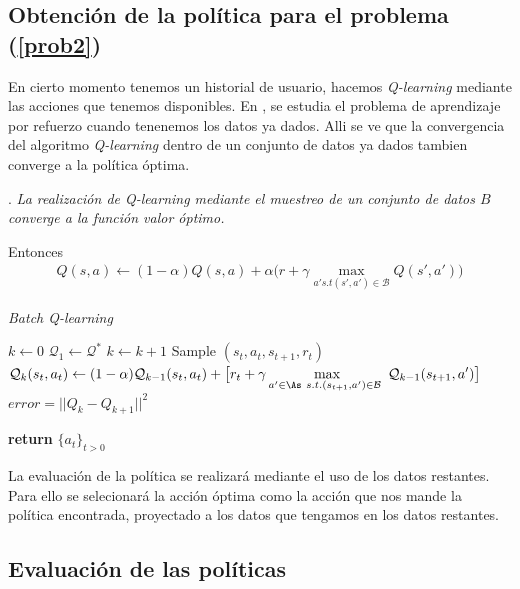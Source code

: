 \subsection{Obtención de la política para el problema (\ref{prob2})}
En cierto momento tenemos un historial de usuario, hacemos \emph{Q-learning} mediante las acciones que tenemos disponibles. En \cite{fujimoto2019off}, se estudia el problema de aprendizaje por refuerzo cuando tenenemos los datos ya dados. Alli se ve que la convergencia del algoritmo \emph{Q-learning} dentro de un conjunto de datos ya dados tambien converge a la política óptima.

\begin{thm}
    \cite{fujimoto2019off}. \textit{La realización de Q-learning mediante el muestreo de un conjunto de datos $B$ converge a la función valor óptimo.}
\end{thm}

Entonces 
\begin{gather}
    Q(s,a) \leftarrow (1-\alpha)Q(s,a) + \alpha \bigg( r +\gamma \max_{a' s.t (s',a') \in \mathcal{B}} Q(s',a') \bigg)
\end{gather}

\begin{algorithm}[!ht]
    \caption{\emph{Batch Q-learning }}\label{Qlearning}
    \begin{algorithmic}[1]
        \State $k \gets 0$
        \State $\mathcal{Q}_1 \gets \mathcal{Q}^{*}$
            \State $k \leftarrow k + 1$
            \State Sample $(s_t,a_t,s_{t+1},r_t)$
            \State $\displaystyle \mathcal{Q}_k(s_t,a_t) \gets (1-\alpha)\mathcal{Q}_{k-1}(s_t,a_t) +  
            \big[ r_t + \gamma \max_{a'\in \As \ s.t.(s_{t+1},a')  \in \mathcal{B} \ }\mathcal{Q}_{k-1}(s_{t+1},a') \big]$
            \State $error=|| Q_k - Q_{k+1}||^2$

        \EndWhile
        \State \textbf{return} $\{a_t\}_{t>0}$
        \EndProcedure
    \end{algorithmic}
\end{algorithm}


La evaluación de la política se realizará mediante el uso de los datos restantes. Para ello se selecionará la acción óptima como la acción que nos mande la política encontrada, proyectado a los datos que tengamos en los datos restantes.



\subsection{Evaluación de las políticas}

